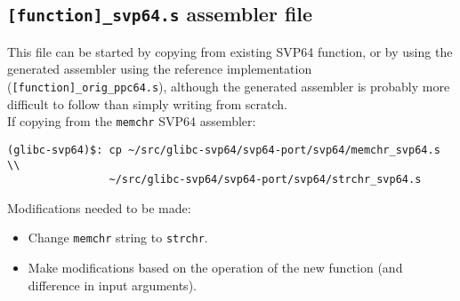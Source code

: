\subsection{\texttt{[function]\_svp64.s} assembler file}

This file can be started by copying from existing \acrshort{SVP64} function,
or by using the generated assembler using the reference implementation
(\texttt{[function]\_orig\_ppc64.s}), although the generated assembler is
probably more difficult to follow than simply writing from scratch.\\

If copying from the \texttt{memchr} \acrshort{SVP64} assembler:
\begin{verbatim}
(glibc-svp64)$: cp ~/src/glibc-svp64/svp64-port/svp64/memchr_svp64.s \\
                ~/src/glibc-svp64/svp64-port/svp64/strchr_svp64.s
\end{verbatim}

Modifications needed to be made:
\begin{itemize}
  \item Change \texttt{memchr} string to \texttt{strchr}.
  \item Make modifications based on the operation of the new function
  (and difference in input arguments).
\end{itemize}
